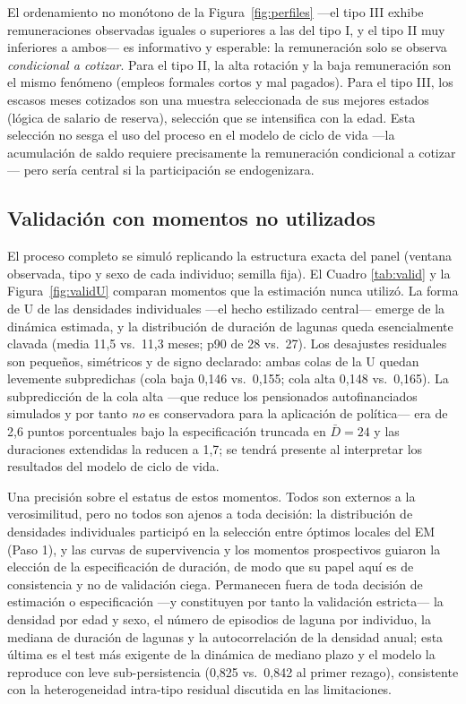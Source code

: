 \documentclass[11pt]{article}
\begin{document}
El ordenamiento no monótono de la Figura~\ref{fig:perfiles} —el tipo III
exhibe remuneraciones observadas iguales o superiores a las del tipo I, y
el tipo II muy inferiores a ambos— es informativo y esperable: la
remuneración solo se observa \emph{condicional a cotizar}. Para el tipo
II, la alta rotación y la baja remuneración son el mismo fenómeno
(empleos formales cortos y mal pagados). Para el tipo III, los escasos
meses cotizados son una muestra seleccionada de sus mejores estados (lógica
de salario de reserva), selección que se intensifica con la edad. Esta
selección no sesga el uso del proceso en el modelo de ciclo de vida —la
acumulación de saldo requiere precisamente la remuneración condicional a
cotizar— pero sería central si la participación se endogenizara.

\subsection{Validación con momentos no utilizados}

El proceso completo se simuló replicando la estructura exacta del panel
(ventana observada, tipo y sexo de cada individuo; semilla fija). El Cuadro
\ref{tab:valid} y la Figura~\ref{fig:validU} comparan momentos que la
estimación nunca utilizó. La forma de U de las densidades individuales
—el hecho estilizado central— emerge de la dinámica estimada, y la
distribución de duración de lagunas queda esencialmente clavada (media
11,5 vs.\ 11,3 meses; p90 de 28 vs.\ 27). Los desajustes residuales son
pequeños, simétricos y de signo declarado: ambas colas de la U quedan
levemente subpredichas (cola baja 0,146 vs.\ 0,155; cola alta 0,148 vs.\
0,165). La subpredicción de la cola alta —que reduce los pensionados
autofinanciados simulados y por tanto \emph{no} es conservadora para la
aplicación de política— era de 2,6 puntos porcentuales bajo la
especificación truncada en $\bar D = 24$ y las duraciones extendidas la
reducen a 1,7; se tendrá presente al interpretar los resultados del modelo
de ciclo de vida.

Una precisión sobre el estatus de estos momentos. Todos son externos a la
verosimilitud, pero no todos son ajenos a toda decisión: la distribución de
densidades individuales participó en la selección entre óptimos locales del
EM (Paso 1), y las curvas de supervivencia y los momentos prospectivos
guiaron la elección de la especificación de duración, de modo que su papel
aquí es de consistencia y no de validación ciega. Permanecen fuera de toda
decisión de estimación o especificación —y constituyen por tanto la
validación estricta— la densidad por edad y sexo, el número de episodios de
laguna por individuo, la mediana de duración de lagunas y la
autocorrelación de la densidad anual; esta última es el test más exigente
de la dinámica de mediano plazo y el modelo la reproduce con leve
sub-persistencia (0,825 vs.\ 0,842 al primer rezago), consistente con la
heterogeneidad intra-tipo residual discutida en las limitaciones.
\end{document}

